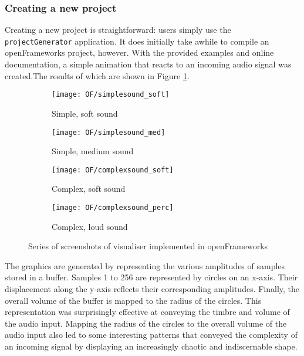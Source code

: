 \documentclass[../frameworkreview.tex]{subfiles}
\begin{document}
\subsubsection{Creating a new project}
Creating a new project is straightforward: users simply use the \verb|projectGenerator| application. It does initially take awhile to compile an openFrameworks project, however. With the provided examples and online documentation, a simple animation that reacts to an incoming audio signal was created.\footnotemark The results of which are shown in Figure \ref{fig:OFVisualiser}.


\begin{figure}
  \begin{subfigure}{0.5\textwidth}
    \texttt{[image: OF/simplesound\_soft]}
    \caption{Simple, soft sound}
  \end{subfigure} 
 \begin{subfigure}{0.5\textwidth}
    \texttt{[image: OF/simplesound\_med]}
    \caption{Simple, medium sound}
  \end{subfigure}
  \begin{subfigure}{0.5\textwidth}
    \texttt{[image: OF/complexsound\_soft]}
    \caption{Complex, soft sound}
  \end{subfigure}
  \begin{subfigure}{0.5\textwidth}
    \texttt{[image: OF/complexsound\_perc]}
    \caption{Complex, loud sound}
  \end{subfigure}
  \caption{Series of screenshots of visualiser implemented in openFrameworks}
  \label{fig:OFVisualiser}
\end{figure}

The graphics are generated by representing the various amplitudes of samples stored in a buffer. Samples 1 to 256 are represented by circles on an x-axis. Their displacement along the y-axis reflects their corresponding amplitudes. Finally, the overall volume of the buffer is mapped to the radius of the circles. This representation was surprisingly effective at conveying the timbre and volume of the audio input. Mapping the radius of the circles to the overall volume of the audio input also led to some interesting patterns that conveyed the complexity of an incoming signal by displaying an increasingly chaotic and indiscernable shape.
\end{document}
